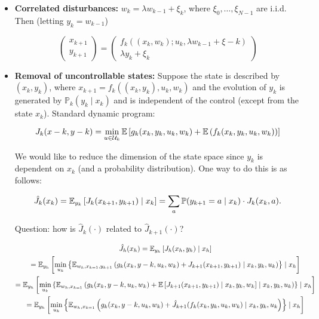 \begin{itemize}
\item \textbf{Correlated disturbances:} \(w_k = \lambda w_{k-1} + \xi_k\), where \(\xi_0, \ldots, \xi_{N-1}\) are i.i.d. Then (letting \(y_k = w_{k-1}\))

\[
\begin{pmatrix}
x_{k+1} \\
y_{k+1}
\end{pmatrix} = \begin{pmatrix}
f_k((x_k, w_k); u_k, \lambda w_{k-1} + \xi-k) \\
\lambda y_k + \xi_k
\end{pmatrix}
\]

\item \textbf{Removal of uncontrollable states:} Suppose the state is described by \((x_k, y_k)\), where \(x_{k+1} = f_k((x_k, y_k), u_k, w_k)\) and the evolution of \(y_k\) is generated by \(\mathbb{P}_k(y_k \mid x_k)\) and is independent of the control (except from the state \(x_k\)). Standard dynamic program:

\[
J_k(x-k, y-k) = \min_{u \in \mathcal{U}_k} \mathbb{E} \left[  g_k(x_k, y_k, u_k, w_k) + \mathbb{E} \left(  f_k(x_k, y_k, u_k, w_k) \right) \right]
\]

We would like to reduce the dimension of the state space since \(y_k\) is dependent on \(x_k\) (and a probability distribution). One way to do this is as follows: 

\[
\hat{J}_k(x_k) = \mathbb{E}_{y_k} \left[ J_k(x_{k+1}, y_{k+1}) \mid x_k \right] = \sum_a \mathbb{P}(y_{k+1} = a \mid x_k) \cdot J_k(x_k, a).
\]

Question: how is \(\hat{J}_k(\cdot)\) related to \(\hat{J}_{k+1}(\cdot)\)?

\begin{multline*}
\hat{J}_h(x_h) = \mathbb{E}_{y_h}  \left[ J_h(x_h, y_h) \mid x_h \right] 
\\ = \mathbb{E}_{y_h} \left[  \min_{u_k} \left\{ \mathbb{E}_{w_h, x_{k=1}, y_{k+1}} \left( g_k(x_k, y-k, u_k, w_k) + J_{k+1}(x_{k+1}, y_{k+1}) \mid x_k, y_k, u_k \right) \right\} \mid x_h \right] 
\\ = \mathbb{E}_{y_h} \left[  \min_{u_k} \left\{ \mathbb{E}_{w_h, x_{k=1}} \left( g_k(x_k, y-k, u_k, w_k) + \mathbb{E} \left[ J_{k+1}(x_{k+1}, y_{k+1}) \mid x_k, y_k, w_k \right] \mid x_k, y_k, u_k \right) \right\} \mid x_h \right] 
\\ = \mathbb{E}_{y_h} \left[  \min_{u_k} \left\{ \mathbb{E}_{w_h, x_{k=1}} \left( g_k(x_k, y-k, u_k, w_k) + \hat{J}_{k+1}(f_k(x_k, y_k, u_k, w_k) \mid x_k, y_k, u_k \right) \right\} \mid x_h \right] 
\end{multline*}

\end{itemize}

